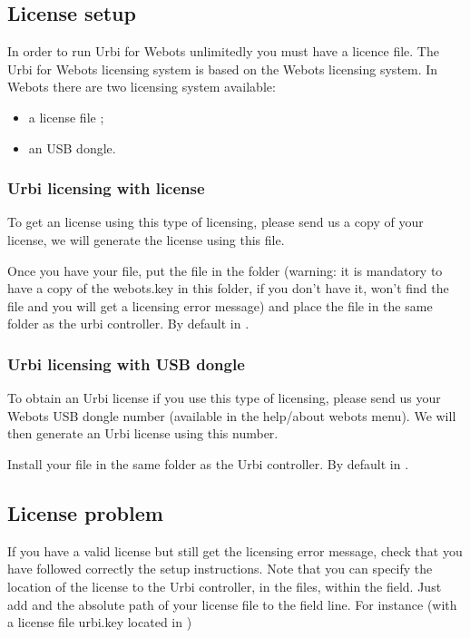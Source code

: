 \subsection{License setup}

In order to run Urbi for Webots unlimitedly you must have a licence
file.  The Urbi for Webots licensing system is based on the Webots
licensing system.  In Webots there are two licensing system available:
\begin{itemize}
\item a license file ;
\item an USB dongle.
\end{itemize}

\subsubsection{Urbi licensing with  license}

To get an \urbi license using this type of licensing, please send us a
copy of your  license, we will generate the \urbi
license using this file.

Once you have your  file, put the 
file in the folder  (warning: it is mandatory
to have a copy of the webots.key in this folder, if you don't have it,
\urbi won't find the  file and you will get a
licensing error message) and place the  file in the
same folder as the urbi controller. By default in
.


\subsubsection{Urbi licensing with USB dongle}

To obtain an Urbi license if you use this type of licensing, please
send us your Webots USB dongle number (available in the help/about
webots menu). We will then generate an Urbi license using this number.

Install your  file in the same folder as the Urbi
controller.  By default in
.

\subsection{License problem}

If you have a valid license but still get the licensing error message,
check that you have followed correctly the setup instructions. Note
that you can specify the location of the  license to
the Urbi controller, in the  files, within the
 field. Just add  and the absolute
path of your license file to the field line. For instance (with a
license file urbi.key located in )

